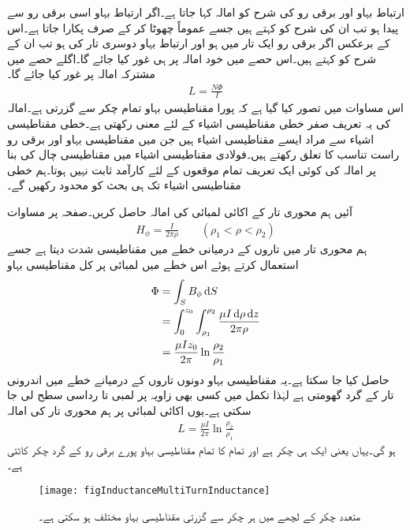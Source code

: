 ارتباط بہاو اور برقی رو کی شرح کو امالہ کہا جاتا ہے۔اگر ارتباط بہاو اسی برقی رو سے پیدا ہو تب ان کی شرح کو  کہتے ہیں جسے عموماً چھوٹا کر کے صرف  پکارا جاتا ہے۔اس کے برعکس اگر برقی رو ایک تار میں ہو اور ارتباط بہاو دوسری تار کی ہو تب ان کے شرح کو  کہتے ہیں۔اس حصے میں خود امالہ پر ہی غور کیا جائے گا۔اگلے حصے میں مشترکہ امالہ پر غور کیا جائے گا۔ 
\begin{align}
L=\frac{N \Phi}{I}
\end{align}
اس مساوات میں تصور کیا گیا ہے کہ پورا مقناطیسی بہاو تمام چکر سے گزرتی ہے۔امالہ کی یہ تعریف صفر خطی مقناطیسی اشیاء کے لئے معنی رکھتی ہے۔خطی مقناطیسی اشیاء سے مراد ایسے مقناطیسی اشیاء ہیں جن میں مقناطیسی بہاو اور برقی رو راست تناسب کا تعلق رکھتے ہیں۔فولادی مقناطیسی اشیاء میں مقناطیسی چال کی بنا پر امالہ کی کوئی ایک تعریف تمام موقعوں کے لئے کارآمد ثابت نہیں ہوتا۔ہم خطی مقناطیسی اشیاء تک ہی بحث کو محدود رکھیں گے۔

آئیں ہم محوری تار کے اکائی لمبائی کی امالہ حاصل کریں۔صفحہ  پر مساوات 
\begin{align*}
H_{\phi}=\frac{I}{2\pi \rho} \quad \quad (\rho_1 < \rho <\rho_2)
\end{align*}
 ہم محوری تار میں تاروں کے درمیانی خطے میں مقناطیسی شدت دیتا ہے جسے استعمال کرتے ہوئے اس خطے میں  لمبائی پر کل مقناطیسی بہاو
\begin{align*}
\Phi&=\int_S B_{\phi} \dif S\\
&=\int_0^{z_0} \int_{\rho_1}^{\rho_2}\frac{\mu I \dif \rho \dif z}{2\pi \rho}\\
&=\frac{\mu  I z_0}{2\pi} \ln \frac{\rho_2}{\rho_1}
\end{align*}
حاصل کیا جا سکتا ہے۔یہ مقناطیسی بہاو دونوں تاروں کے درمیانے خطے میں  اندرونی تار کے گرد گھومتی ہے لہٰذا تکمل میں کسی بھی زاویہ پر  لمبی  تا  رداسی سطح لی جا سکتی ہے۔یوں اکائی لمبائی پر ہم محوری تار  کی امالہ
\begin{align}\label{مساوات_امالہ_ہم_محوری_کم_تعددی_امالہ}
L=\frac{\mu  I }{2\pi} \ln \frac{\rho_2}{\rho_1}
\end{align}
ہو گی۔یہاں  یعنی ایک ہی چکر ہے اور تمام کا تمام مقناطیسی بہاو پورے برقی رو کے گرد چکر کاٹتی ہے۔
\begin{figure}
\centering
\texttt{[image: figInductanceMultiTurnInductance]}
\caption{متعدد چکر کے لچھے میں ہر چکر سے گزرتی مقناطیسی بہاو مختلف ہو سکتی ہے۔}
\label{شکل_امالہ_متعدد_چکر}
\end{figure}


